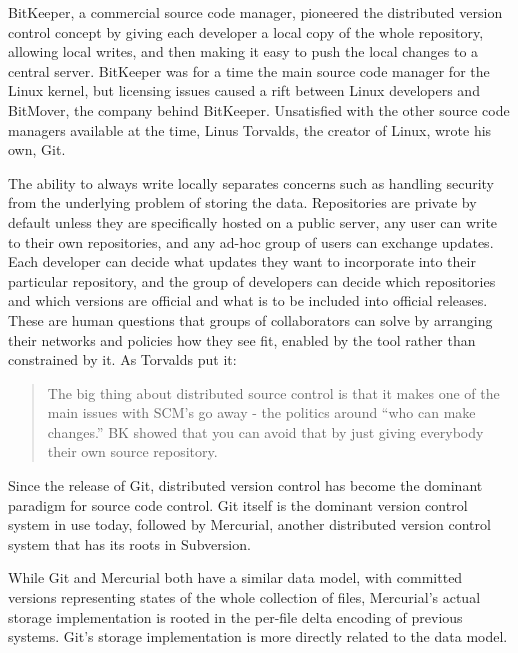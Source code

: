 BitKeeper, a commercial source code manager, pioneered the distributed version
control concept by giving each developer a local copy of the whole repository,
allowing local writes, and then making it easy to push the local changes to a
central server. BitKeeper was for a time the main source code manager for the
Linux kernel, but licensing issues caused a rift between Linux developers and
BitMover, the company behind BitKeeper. Unsatisfied with the other source code
managers available at the time, Linus Torvalds, the creator of Linux, wrote his
own, Git.

The ability to always write locally separates concerns such as handling security from the
underlying problem of storing the data. Repositories are private by default
unless they are specifically hosted on a public server, any user can write to
their own repositories, and any ad-hoc group of users can exchange updates. Each
developer can decide what updates they want to incorporate into their particular
repository, and the group of developers can decide which repositories and which
versions are official and what is to be included into official releases. These
are human questions that groups of collaborators can solve by arranging their
networks and policies how they see fit, enabled by the tool rather than
constrained by it. As Torvalds put it:

\blockcquote{git_10_years_interview}{The big thing about distributed source
    control is that it makes one of the main issues with SCM's go away - the
    politics around \enquote{who can make changes.} BK 
    showed that you can avoid that by just giving everybody their own source
repository. }


Since the release of Git, distributed version control has become the dominant
paradigm for source code control. Git itself is the dominant version control
system in use today, followed by Mercurial, another distributed version control
system that has its roots in Subversion.

While Git and Mercurial both have a similar data model, with committed versions
representing states of the whole collection of files, Mercurial's actual storage
implementation is rooted in the per-file delta encoding of previous systems.
Git's storage implementation is more directly related to the data model.

